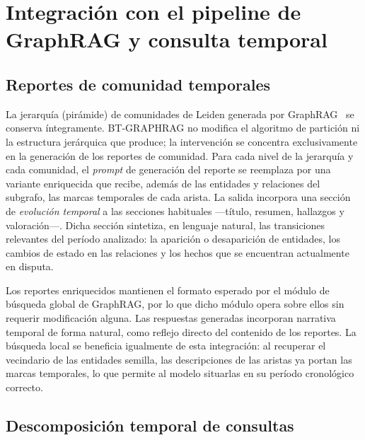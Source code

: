 \section{Integración con el pipeline de GraphRAG y consulta temporal}\label{sec:bt-integration}

\subsection{Reportes de comunidad temporales}

La jerarquía (pirámide) de comunidades de Leiden generada por GraphRAG~\cite{edge2024local} se conserva íntegramente. BT-GRAPHRAG no modifica el algoritmo de partición ni la estructura jerárquica que produce; la intervención se concentra exclusivamente en la generación de los reportes de comunidad. Para cada nivel de la jerarquía y cada comunidad, el \emph{prompt} de generación del reporte se reemplaza por una variante enriquecida que recibe, además de las entidades y relaciones del subgrafo, las marcas temporales de cada arista. La salida incorpora una sección de \emph{evolución temporal} a las secciones habituales ---título, resumen, hallazgos y valoración---. Dicha sección sintetiza, en lenguaje natural, las transiciones relevantes del período analizado: la aparición o desaparición de entidades, los cambios de estado en las relaciones y los hechos que se encuentran actualmente en disputa.


Los reportes enriquecidos mantienen el formato esperado por el módulo de búsqueda global de GraphRAG, por lo que dicho módulo opera sobre ellos sin requerir modificación alguna. Las respuestas generadas incorporan narrativa temporal de forma natural, como reflejo directo del contenido de los reportes. La búsqueda local se beneficia igualmente de esta integración: al recuperar el vecindario de las entidades semilla, las descripciones de las aristas ya portan las marcas temporales, lo que permite al modelo situarlas en su período cronológico correcto.

\subsection{Descomposición temporal de consultas}

